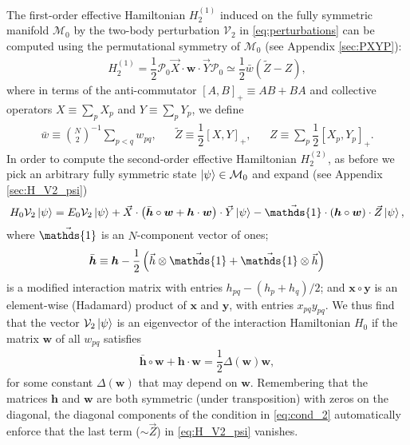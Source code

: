\documentclass[nofootinbib,notitlepage,11pt]{revtex4-2}
\newcommand{\f}[2]{\dfrac{#1}{#2}} %
\newcommand{\p}[1]{\left(#1\right)} %
\renewcommand{\sp}[1]{\left[#1\right]} %
\renewcommand{\c}{\cdot} %
\renewcommand{\oc}{\circ} %
\newcommand{\m}{\bm} %
\renewcommand{\v}{\vec} %
\newcommand{\1}{\mathds{1}}
\newcommand{\M}{\mathcal{M}}
\renewcommand{\P}{\mathcal{P}}
\newcommand{\V}{\mathcal{V}}
\begin{document}
The first-order effective Hamiltonian $H_2^{(1)}$ induced on the fully
symmetric manifold $\M_0$ by the two-body perturbation $\V_2$ in
\eqref{eq:perturbations} can be computed using the permutational
symmetry of $\M_0$ (see Appendix \ref{sec:PXYP}):
\begin{align}
  H_2^{(1)}
  = \f12 \P_0 \v X\c\m w\c\v Y\P_0
  \simeq \f12 \bar w \p{\tilde Z - Z},
\end{align}
where in terms of the anti-commutator $\sp{A,B}_+\equiv AB+BA$ and
collective operators $X\equiv\sum_p X_p$ and $Y\equiv\sum_p Y_p$, we
define
\begin{align}
  \bar w \equiv {N\choose 2}^{-1} \sum_{p<q} w_{pq},
  &&
  \tilde Z \equiv \f12 \sp{X,Y}_+,
  &&
  Z \equiv \sum_p \f12 \sp{X_p, Y_p}_+.
\end{align}
In order to compute the second-order effective Hamiltonian
$H_2^{(2)}$, as before we pick an arbitrary fully symmetric state
$\ket\psi\in\M_0$ and expand (see Appendix \ref{sec:H_V2_psi})
\begin{align}
  H_0 \V_2 \ket\psi
  = E_0 \V_2 \ket\psi
  + \v X \c \p{\bar{\m h}\oc\m w + \m h\c\m w} \c \v Y \ket\psi
  - \v\1 \c \p{\m h\oc\m w} \c \v Z \ket\psi,
  \label{eq:H_V2_psi}
\end{align}
where $\v\1$ is an $N$-component vector of ones;
\begin{align}
  \bar{\m h}
  \equiv \m h - \f12\p{\v h\otimes\v\1 + \v\1\otimes\v h}
\end{align}
is a modified interaction matrix with entries $h_{pq}-\p{h_p+h_q}/2$;
and $\m x\oc\m y$ is an element-wise (Hadamard) product of $\m x$ and
$\m y$, with entries $x_{pq}y_{pq}$.  We thus find that the vector
$\V_2\ket\psi$ is an eigenvector of the interaction Hamiltonian $H_0$
if the matrix $\m w$ of all $w_{pq}$ satisfies
\begin{align}
  \bar{\m h}\oc\m w + \m h\c\m w = \f12 \Delta\p{\m w} \m w,
  \label{eq:cond_2}
\end{align}
for some constant $\Delta\p{\m w}$ that may depend on $\m w$.
Remembering that the matrices $\m h$ and $\m w$ are both symmetric
(under transposition) with zeros on the diagonal, the diagonal
components of the condition in \eqref{eq:cond_2} automatically enforce
that the last term ($\sim\v Z$) in \eqref{eq:H_V2_psi} vanishes.
\end{document}
